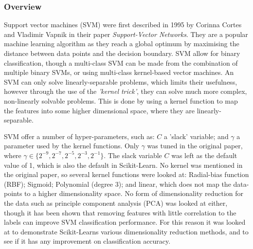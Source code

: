 \documentclass[12pt,a4paper,titlepage,twoside]{report}
\begin{document}
\subsubsection*{Overview}
	Support vector machines (SVM) were first described in 1995 by Corinna Cortes and Vladimir Vapnik in their paper \textit{Support-Vector Networks}\cite{support-vector-machines}. They are a popular machine learning algorithm as they reach a global optimum by maximising the distance between data points and the decision boundary. SVM allow for binary classification, though a multi-class SVM can be made from the combination of multiple binary SVMs, or using multi-class kernel-based vector machines\cite{multiclass-svm}. An SVM can only solve linearly-separable problems, which limits their usefulness, however through the use of the \textit{'kernel trick'}\cite{ml-algorithmic-perspective}, they can solve much more complex, non-linearly solvable  problems. This is done by using a kernel function to map the features into some higher dimensional space, where they are linearly-separable. \par
	SVM offer a number of hyper-parameters, such as: \textbf{$C$} a 'slack' variable; and $\gamma$ a parameter used by the kernel functions. Only $\gamma$ was tuned in the original paper, where $\gamma \in \{2^{-9}, 2^{-7}, 2^{-5}, 2^{-3}, 2^{-1}\}$. The slack variable $C$ was left as the default value of 1, which is also the default in Scikit-Learn. No kernel was mentioned in the original paper, so several kernel functions were looked at: Radial-bias function (RBF); Sigmoid; Polynomial (degree 3); and linear, which does not map the data-points to a higher dimensionality space. No form of dimensionality reduction for the data such as principle component analysis (PCA) was looked at either, though it has been shown that removing features with little correlation to the labels can improve SVM classification performance\cite{svm-reduce-dim}. For this reason it was looked at to demonstrate Scikit-Learns various dimensionality reduction methods, and to see if it has any improvement on classification accuracy.
	
\end{document}
